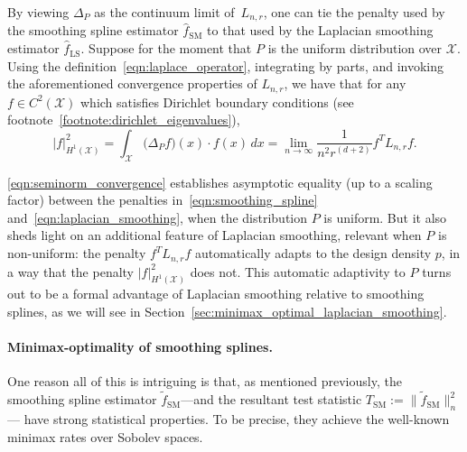 \documentclass{article}
\newcommand{\abs}[1]{\left \lvert #1 \right \rvert}
\newcommand{\1}{\mathbf{1}}
\newcommand{\Lap}{L}
\newcommand{\Xset}{\mathcal{X}}
\newcommand{\wt}[1]{\widetilde{#1}}
\newcommand{\wh}[1]{\widehat{#1}}
\newcommand{\LS}{\mathrm{LS}}
\newcommand{\SM}{\mathrm{SM}}
\theoremstyle{alden}
\theoremstyle{aldenthm}
\theoremstyle{definition}
\theoremstyle{remark}
\begin{document}
By viewing $\Delta_P$ as the continuum limit of~$\Lap_{n,r}$, one can tie the penalty used by the smoothing spline estimator $\wh{f}_{\SM}$ to that used by the Laplacian smoothing estimator $\wh{f}_{\LS}$. Suppose for the moment that $P$ is the uniform distribution over $\Xset$. Using the definition~\eqref{eqn:laplace_operator}, integrating by parts, and invoking the aforementioned convergence properties of $\Lap_{n,r}$, we have that for any $f \in C^{2}(\Xset)$ which satisfies Dirichlet boundary conditions (see footnote~\ref{footnote:dirichlet_eigenvalues}),
\begin{equation}
\label{eqn:seminorm_convergence}
\abs{f}_{H^1(\Xset)}^2 = \int_{\Xset} \bigl(\Delta_P f\bigr)(x) \cdot f(x) \,dx = \lim_{n \to \infty} \frac{1}{n^{2}r^{(d + 2)}}f^T \Lap_{n,r} f.
\end{equation}

\eqref{eqn:seminorm_convergence} establishes asymptotic equality (up to a scaling factor) between the penalties in~\eqref{eqn:smoothing_spline} and~\eqref{eqn:laplacian_smoothing}, when the distribution $P$ is uniform. But it also sheds light on an additional feature of Laplacian smoothing, relevant when $P$ is non-uniform: the penalty $f^T \Lap_{n,r} f$ automatically adapts to the design density $p$, in a way that the penalty $|f|_{H^1(\Xset)}^2$ does not. This automatic adaptivity to $P$ turns out to be a formal advantage of Laplacian smoothing relative to smoothing splines, as we will see in Section~\ref{sec:minimax_optimal_laplacian_smoothing}.

\paragraph{Minimax-optimality of smoothing splines.} 
One reason all of this is intriguing is that, as mentioned previously, the smoothing spline estimator $\wt{f}_{\SM}$---and the resultant test statistic $T_{\SM} := \|\wt{f}_{\SM}\|_n^2$--- have strong statistical properties. To be precise, they achieve the well-known minimax rates over Sobolev spaces.
\end{document}
